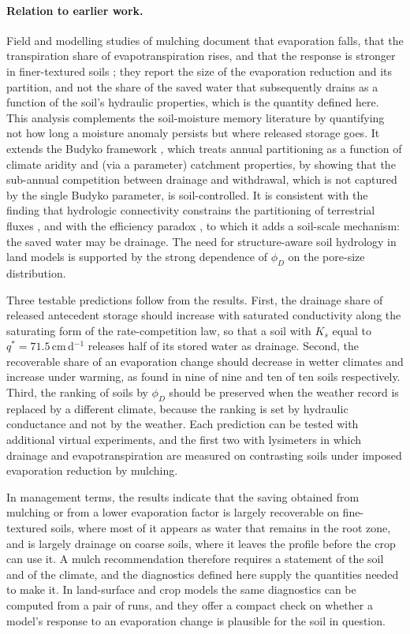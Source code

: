 \documentclass[preprint,12pt,authoryear]{elsarticle}
\begin{document}
\paragraph{Relation to earlier work.}
Field and modelling studies of mulching document that evaporation falls, that the transpiration share of evapotranspiration rises, and that the response is stronger in finer-textured soils \citep{Zheng2021,Kang2024}; they report the size of the evaporation reduction and its partition, and not the share of the saved water that subsequently drains as a function of the soil's hydraulic properties, which is the quantity defined here. This analysis complements the soil-moisture memory literature \citep{Koster2001,Seneviratne2010} by quantifying not how long a moisture anomaly persists but where released storage goes. It extends the Budyko framework \citep{Budyko1974,Milly1994}, which treats annual partitioning as a function of climate aridity and (via a parameter) catchment properties, by showing that the sub-annual competition between drainage and withdrawal, which is not captured by the single Budyko parameter, is soil-controlled. It is consistent with the finding that hydrologic connectivity constrains the partitioning of terrestrial fluxes \citep{Good2015}, and with the efficiency paradox \citep{Grafton2018,Ward2008}, to which it adds a soil-scale mechanism: the saved water may be drainage. The need for structure-aware soil hydrology in land models \citep{Fatichi2020,Vereecken2016,Vereecken2019} is supported by the strong dependence of $\phi_D$ on the pore-size distribution.


Three testable predictions follow from the results. First, the drainage share of released antecedent storage should increase with saturated conductivity along the saturating form of the rate-competition law, so that a soil with $K_s$ equal to $q^{*}=71.5$\,cm\,d$^{-1}$ releases half of its stored water as drainage. Second, the recoverable share of an evaporation change should decrease in wetter climates and increase under warming, as found in nine of nine and ten of ten soils respectively. Third, the ranking of soils by $\phi_D$ should be preserved when the weather record is replaced by a different climate, because the ranking is set by hydraulic conductance and not by the weather. Each prediction can be tested with additional virtual experiments, and the first two with lysimeters in which drainage and evapotranspiration are measured on contrasting soils under imposed evaporation reduction by mulching.

In management terms, the results indicate that the saving obtained from mulching or from a lower evaporation factor is largely recoverable on fine-textured soils, where most of it appears as water that remains in the root zone, and is largely drainage on coarse soils, where it leaves the profile before the crop can use it. A mulch recommendation therefore requires a statement of the soil and of the climate, and the diagnostics defined here supply the quantities needed to make it. In land-surface and crop models the same diagnostics can be computed from a pair of runs, and they offer a compact check on whether a model's response to an evaporation change is plausible for the soil in question.
\end{document}
